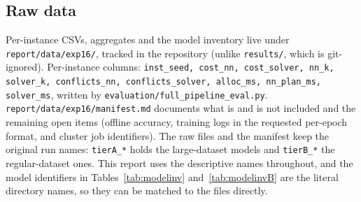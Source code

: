 \documentclass[11pt,a4paper]{article}
\begin{document}
\subsection*{Raw data}

Per-instance CSVs, aggregates and the model inventory live under \texttt{report/data/exp16/},
tracked in the repository (unlike \texttt{results/}, which is git-ignored). Per-instance columns:
\texttt{inst\_seed, cost\_nn, cost\_solver, nn\_k, solver\_k, conflicts\_nn, conflicts\_solver,
alloc\_ms, nn\_plan\_ms, solver\_ms}, written by \texttt{evaluation/full\_pipeline\_eval.py}.
\texttt{report/data/exp16/manifest.md} documents what is and is not included and the remaining
open items (offline accuracy, training logs in the requested per-epoch format, and cluster job
identifiers). The raw files and the manifest keep the original run names: \texttt{tierA\_*} holds
the large-dataset models and \texttt{tierB\_*} the regular-dataset ones. This report uses the
descriptive names throughout, and the model identifiers in Tables~\ref{tab:modelinv}
and~\ref{tab:modelinvB} are the literal directory names, so they can be matched to the files
directly.
\end{document}
